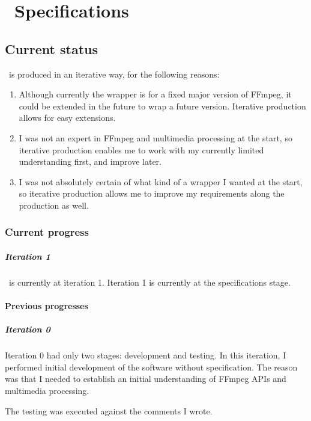 \chapter{\ffwrappername\ Specifications}

\section{Current status}
\ffwname\ is produced in an iterative way, for the following reasons:
\begin{enumerate}
	\item Although currently the wrapper is for a fixed major version of FFmpeg, it could be extended in the future to wrap a future version. 
	Iterative production allows for easy extensions.
	\item I was not an expert in FFmpeg and multimedia processing at the start, so iterative production enables me to work with my currently limited understanding first,
	and improve later.
	\item I was not absolutely certain of what kind of a wrapper I wanted at the start, so iterative production allows me to 
	improve my requirements along the production as well.
\end{enumerate}

\subsection{Current progress}
\paragraph{Iteration 1} \ffwname\ is currently at iteration 1.
Iteration 1 is currently at the specifications stage.

\subsubsection{Previous progresses}
\paragraph{Iteration 0} Iteration 0 had only two stages: development and testing.
In this iteration, I performed initial development of the software without specification. 
The reason was that I needed to establish an initial understanding of FFmpeg APIs and multimedia processing.

The testing was executed against the comments I wrote.

